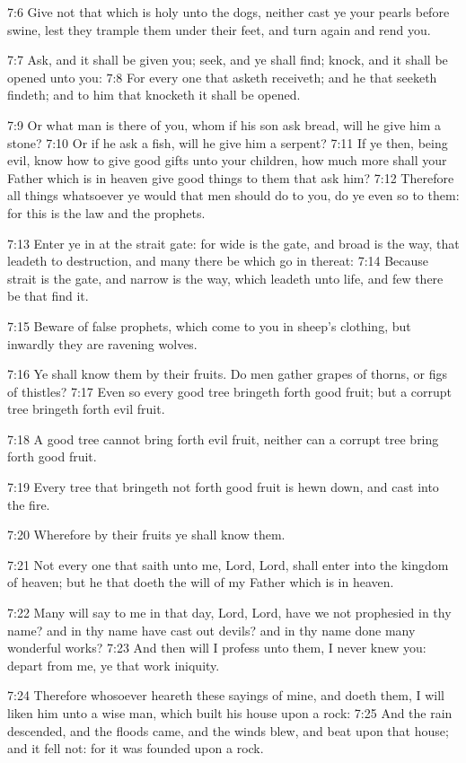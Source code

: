 7:6 Give not that which is holy unto the dogs, neither cast ye your
pearls before swine, lest they trample them under their feet, and turn
again and rend you.

7:7 Ask, and it shall be given you; seek, and ye shall find; knock,
and it shall be opened unto you: 7:8 For every one that asketh
receiveth; and he that seeketh findeth; and to him that knocketh it
shall be opened.

7:9 Or what man is there of you, whom if his son ask bread, will he
give him a stone?  7:10 Or if he ask a fish, will he give him a
serpent?  7:11 If ye then, being evil, know how to give good gifts
unto your children, how much more shall your Father which is in heaven
give good things to them that ask him?  7:12 Therefore all things
whatsoever ye would that men should do to you, do ye even so to them:
for this is the law and the prophets.

7:13 Enter ye in at the strait gate: for wide is the gate, and broad
is the way, that leadeth to destruction, and many there be which go in
thereat: 7:14 Because strait is the gate, and narrow is the way, which
leadeth unto life, and few there be that find it.

7:15 Beware of false prophets, which come to you in sheep's clothing,
but inwardly they are ravening wolves.

7:16 Ye shall know them by their fruits. Do men gather grapes of
thorns, or figs of thistles?  7:17 Even so every good tree bringeth
forth good fruit; but a corrupt tree bringeth forth evil fruit.

7:18 A good tree cannot bring forth evil fruit, neither can a corrupt
tree bring forth good fruit.

7:19 Every tree that bringeth not forth good fruit is hewn down, and
cast into the fire.

7:20 Wherefore by their fruits ye shall know them.

7:21 Not every one that saith unto me, Lord, Lord, shall enter into
the kingdom of heaven; but he that doeth the will of my Father which
is in heaven.

7:22 Many will say to me in that day, Lord, Lord, have we not
prophesied in thy name? and in thy name have cast out devils? and in
thy name done many wonderful works?  7:23 And then will I profess unto
them, I never knew you: depart from me, ye that work iniquity.

7:24 Therefore whosoever heareth these sayings of mine, and doeth
them, I will liken him unto a wise man, which built his house upon a
rock: 7:25 And the rain descended, and the floods came, and the winds
blew, and beat upon that house; and it fell not: for it was founded
upon a rock.

